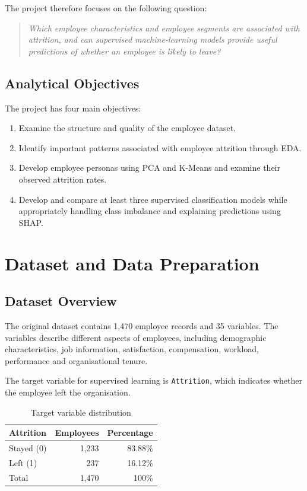 \documentclass[11pt]{article}
\begin{document}
The project therefore focuses on the following question:

\begin{quote}
\itshape Which employee characteristics and employee segments are associated with attrition, and can supervised machine-learning models provide useful predictions of whether an employee is likely to leave?
\end{quote}

\subsection{Analytical Objectives}

The project has four main objectives:

\begin{enumerate}[label=(\arabic*)]
    \item Examine the structure and quality of the employee dataset.
    \item Identify important patterns associated with employee attrition through EDA.
    \item Develop employee personas using PCA and K-Means and examine their observed attrition rates.
    \item Develop and compare at least three supervised classification models while appropriately handling class imbalance and explaining predictions using SHAP.
\end{enumerate}

\section{Dataset and Data Preparation}

\subsection{Dataset Overview}

The original dataset contains 1,470 employee records and 35 variables. The variables describe different aspects of employees, including demographic characteristics, job information, satisfaction, compensation, workload, performance and organisational tenure.

The target variable for supervised learning is \texttt{Attrition}, which indicates whether the employee left the organisation.

\begin{table}[H]
\centering
\begin{tabular}{lrr}
\toprule
\textbf{Attrition} & \textbf{Employees} & \textbf{Percentage} \\
\midrule
Stayed (0) & 1,233 & 83.88\% \\
Left (1)   & 237   & 16.12\% \\
\midrule
Total      & 1,470 & 100\% \\
\bottomrule
\end{tabular}
\caption{Target variable distribution}
\end{table}
\end{document}
